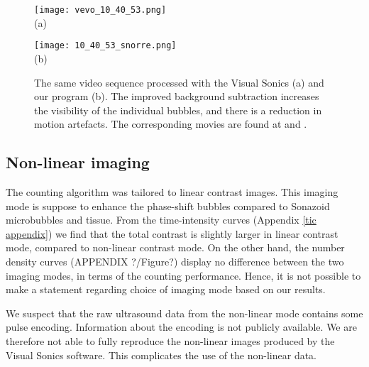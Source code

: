 \begin{figure}[h]
	\centering
	\begin{minipage}[b]{0.42\textwidth}
		\centering
		\texttt{[image: vevo\_10\_40\_53.png]}\\
		(a)
	\end{minipage}%
	\begin{minipage}[b]{0.35\textwidth}
		\centering
		\texttt{[image: 10\_40\_53\_snorre.png]}\\
		(b)
	\end{minipage}%
	 \cprotect\caption{The same video sequence processed with the Visual Sonics (a) and our program (b). The improved background subtraction increases the visibility of the individual bubbles, and there is a reduction in motion artefacts. The corresponding movies are found at  and .}
	\label{Fig:compare VisualSonics}
\end{figure}

\subsection{Non-linear imaging}
The counting algorithm was tailored to linear contrast images. This imaging mode is suppose to enhance the phase-shift bubbles compared to Sonazoid\texttrademark{} microbubbles and tissue. From the time-intensity curves (Appendix \ref{tic appendix}) we find that the total contrast is slightly larger in linear contrast mode, compared to non-linear contrast mode. On the other hand, the number density curves (APPENDIX ?/Figure?) display no difference between the two imaging modes, in terms of the counting performance. Hence, it is not possible to make a statement regarding choice of imaging mode based on our results.

We suspect that the raw ultrasound data from the non-linear mode contains some pulse encoding. Information about the encoding is not publicly available. We are therefore not able to fully reproduce the non-linear images produced by the Visual Sonics software. This complicates the use of the non-linear data.  





%
%

